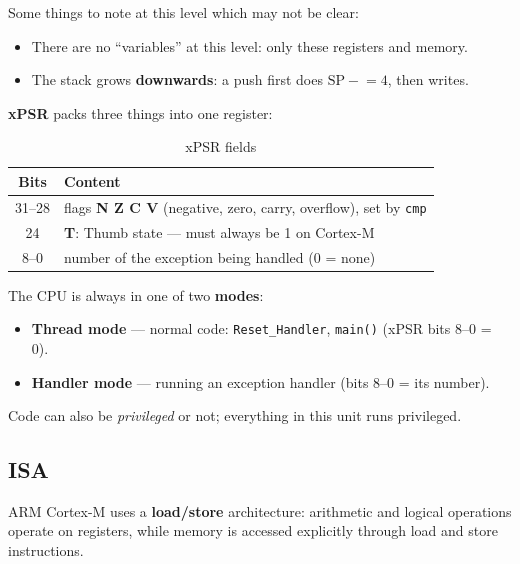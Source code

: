 \documentclass[a4paper,11pt]{article}
\begin{document}
Some things to note at this level which may not be clear:

\begin{itemize}
	\item There are no ``variables'' at this level: only these registers and
	      memory.
	\item The stack grows \textbf{downwards}: a push first does
	      $\mathrm{SP} \mathrel{-}= 4$, then writes.
\end{itemize}

\par\smallskip

\textbf{xPSR} packs three things into one register:

\begin{table}[ht]
	\centering
	\begin{tabular}{cl}
		\hline
		Bits   & Content                                                   \\
		\hline
		31--28 & flags \textbf{N Z C V} (negative, zero, carry, overflow),
		set by \texttt{cmp}                                                \\
		24     & \textbf{T}: Thumb state --- must always be 1 on Cortex-M  \\
		8--0   & number of the exception being handled (0 = none)          \\
		\hline
	\end{tabular}
	\caption{xPSR fields}
	\label{tab:xpsr-fields}
\end{table}

The CPU is always in one of two \textbf{modes}:

\begin{itemize}
	\item \textbf{Thread mode} --- normal code: \texttt{Reset\_Handler},
	      \texttt{main()} (xPSR bits 8--0 = 0).

	\item \textbf{Handler mode} --- running an exception handler
	      (bits 8--0 = its number).
\end{itemize}

Code can also be \emph{privileged} or not; everything in this unit runs
privileged.

\subsection{ISA}

\lstset{language=arm}

ARM Cortex-M uses a \textbf{load/store} architecture: arithmetic and
logical operations operate on registers, while memory is accessed explicitly
through load and store instructions.
\end{document}
